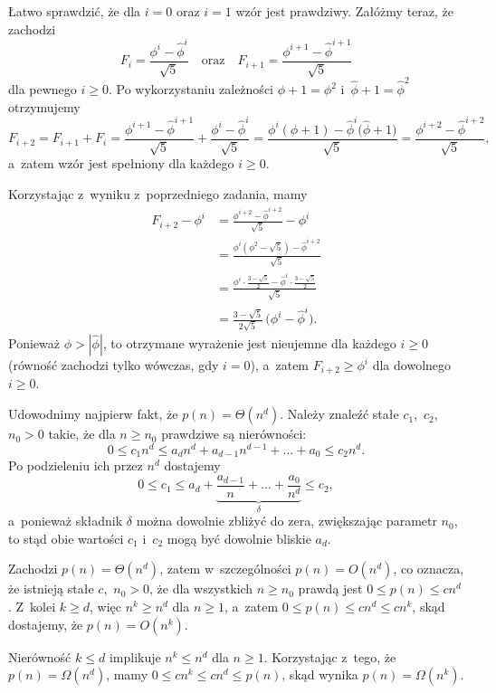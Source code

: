 \exercise %
Łatwo sprawdzić, że dla $i=0$ oraz $i=1$ wzór jest prawdziwy. Załóżmy teraz, że zachodzi
\[
	F_i = \frac{\phi^i-\widehat\phi^i}{\sqrt{5}} \quad\text{oraz}\quad F_{i+1} = \frac{\phi^{i+1}-\widehat\phi^{i+1}}{\sqrt{5}}
\]
dla pewnego $i\ge0$. Po wykorzystaniu zależności $\phi+1=\phi^2$ i~$\widehat\phi+1=\widehat\phi^2$ otrzymujemy
\[
	F_{i+2} = F_{i+1}+F_i = \frac{\phi^{i+1}-\widehat\phi^{i+1}}{\sqrt{5}}+\frac{\phi^i-\widehat\phi^i}{\sqrt{5}} = \frac{\phi^i(\phi+1)-\widehat\phi^i\bigl(\widehat\phi+1\bigr)}{\sqrt{5}} = \frac{\phi^{i+2}-\widehat\phi^{i+2}}{\sqrt{5}},
\]
a~zatem wzór jest spełniony dla każdego $i\ge0$.

\exercise %
Korzystając z~wyniku z~poprzedniego zadania, mamy
\begin{align*}
    F_{i+2}-\phi^i &= \frac{\phi^{i+2}-\widehat\phi^{i+2}}{\sqrt{5}}-\phi^i \\[1mm]
	&= \frac{\phi^i(\phi^2-\sqrt{5})-\widehat\phi^{i+2}}{\sqrt{5}} \\[1mm]
	&= \frac{\phi^i\cdot\frac{3-\sqrt{5}}{2}-\widehat\phi^i\cdot\frac{3-\sqrt{5}}{2}}{\sqrt{5}} \\
	&= \frac{3-\sqrt{5}}{2\sqrt{5}}\,\bigl(\phi^i-\widehat\phi^i\bigr).
\end{align*}
Ponieważ $\phi>|\widehat\phi|$, to otrzymane wyrażenie jest nieujemne dla każdego $i\ge0$ (równość zachodzi tylko wówczas, gdy $i=0$), a~zatem $F_{i+2}\ge\phi^i$ dla dowolnego $i\ge0$.

\problems

Udowodnimy najpierw fakt, że $p(n)=\Theta(n^d)$. Należy znaleźć stałe $c_1$,~$c_2$,~$n_0>0$ takie, że dla $n\ge n_0$ prawdziwe są nierówności:
\[
	0 \le c_1n^d \le a_dn^d+a_{d-1}n^{d-1}+\dots+a_0 \le c_2n^d.
\]
Po podzieleniu ich przez $n^d$ dostajemy
\[
	0 \le c_1 \le a_d+\underbrace{\frac{a_{d-1}}{n}+\dots+\frac{a_0}{n^d}}_\delta \le c_2,
\]
a~ponieważ składnik $\delta$ można dowolnie zbliżyć do zera, zwiększając parametr $n_0$, to stąd obie wartości $c_1$ i~$c_2$ mogą być dowolnie bliskie $a_d$.

\subproblem %
Zachodzi $p(n)=\Theta(n^d)$, zatem w~szczególności $p(n)=O(n^d)$, co oznacza, że istnieją stałe $c$,~$n_0>0$, że dla wszystkich $n\ge n_0$ prawdą jest $0\le p(n)\le cn^d$. Z~kolei $k\ge d$, więc $n^k\ge n^d$ dla $n\ge1$, a~zatem $0\le p(n)\le cn^d\le cn^k$, skąd dostajemy, że $p(n)=O(n^k)$.

\subproblem %
Nierówność $k\le d$ implikuje $n^k\le n^d$ dla $n\ge1$. Korzystając z~tego, że $p(n)=\Omega(n^d)$, mamy $0\le cn^k\le cn^d\le p(n)$, skąd wynika $p(n)=\Omega(n^k)$.


